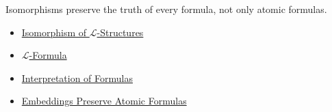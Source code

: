 \begin{remark*}[Interpretation]
Isomorphisms preserve the truth of every formula, not only atomic formulas.
\end{remark*}

\begin{dependencies}
\begin{itemize}
  \item \hyperref[def:l-structure-isomorphism]{Isomorphism of $\mathcal{L}$-Structures}
  \item \hyperref[def:l-formula]{$\mathcal{L}$-Formula}
  \item \hyperref[def:formula-interpretation]{Interpretation of Formulas}
  \item \hyperref[lem:embeddings-preserve-atomic-formulas]{Embeddings Preserve Atomic Formulas}
\end{itemize}
\end{dependencies}
